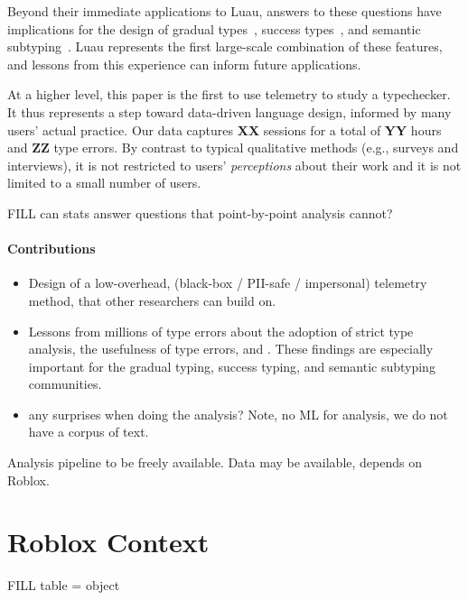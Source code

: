 \documentclass[english,submission,cleveref]{programming}
\begin{document}
Beyond their immediate applications to {Luau},
answers to these questions have implications for the design
of gradual types~\cite{st-sfp-2006}, success types~\cite{lindahl2006practical},
and semantic subtyping~\cite{CF05:GentleIntroduction,Jef22:SemanticSubtyping}.
Luau represents the first large-scale combination of these features,
and lessons from this experience can inform future applications.

At a higher level, this paper is the first to use telemetry 
to study a typechecker.
It thus represents a step toward data-driven language design,
informed by many users' actual practice.
Our data captures \textbf{XX} sessions
for a total of \textbf{YY} hours
and \textbf{ZZ} type errors.
By contrast to typical qualitative methods (e.g., surveys and interviews), it
is not restricted to users' \emph{perceptions} about their work and it is not
limited to a small number of users.

FILL can stats answer questions that point-by-point analysis cannot?

\paragraph{Contributions}
\begin{itemize}
  \item
    Design of a low-overhead, (black-box / PII-safe / impersonal)
    telemetry method, that other
    researchers can build on.

  \item
    Lessons from millions of type errors about
    the adoption of strict type analysis,
    the usefulness of type errors,
    and \FILL{}.
    These findings are especially important for the
    gradual typing, success typing, and semantic subtyping communities.

  \item
    \FILL{} any surprises when doing the analysis?
    Note, no ML for analysis, we do not have a corpus of text.

\end{itemize}

Analysis pipeline to be freely available.
Data may be available, depends on Roblox.


\section{{Roblox} Context}

FILL table = object
\end{document}
